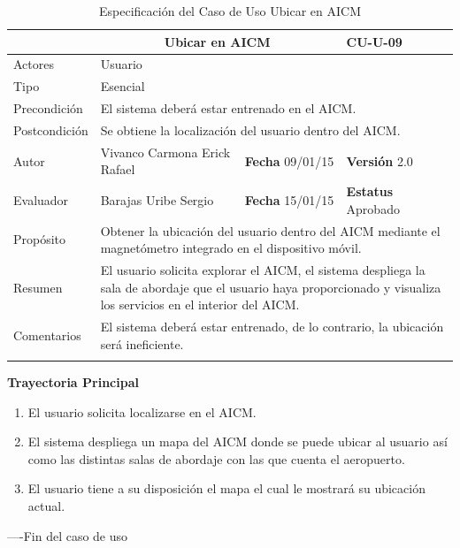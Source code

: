\begin{longtable}{|p{2.5cm}|p{6.4cm}|p{2cm}|p{2cm}|}
	\hline
		\rowcolor[RGB]{51,153,255}{Caso de Uso}&\multicolumn{2}{c}{Ubicar en AICM}&{\textbf{CU-U-09}}\\
	\hline
		{Actores}&\multicolumn{3}{p{11.2cm}|}{Usuario}\\
	\hline
		{Tipo}&\multicolumn{3}{p{11.2cm}|}{Esencial}\\
	\hline
		{Precondición}&\multicolumn{3}{p{11.2cm}|}{El sistema deberá estar entrenado en el AICM.}\\
	\hline
		{Postcondición}&\multicolumn{3}{p{11.2cm}|}{Se obtiene la localización del usuario dentro del AICM.}\\
	\hline
		{Autor}&{Vivanco Carmona Erick Rafael}&{\textbf{Fecha} 09/01/15}&{\textbf{Versión} 2.0}\\
			\hline
		{Evaluador}&{Barajas Uribe Sergio}&{\textbf{Fecha} 15/01/15}&{\textbf{Estatus} Aprobado}\\
	\hline
		{Propósito}&\multicolumn{3}{p{11.2cm}|}{Obtener la ubicación del usuario dentro del AICM mediante el magnetómetro integrado en el dispositivo móvil. }\\
	\hline
		{Resumen}&\multicolumn{3}{p{11.2cm}|}{El usuario solicita explorar el AICM, el sistema despliega la sala de abordaje que el usuario haya proporcionado y visualiza los servicios en el interior del AICM.}\\	
	\hline
		{Comentarios}&\multicolumn{3}{p{11.2cm}|}{El sistema deberá estar entrenado, de lo contrario, la ubicación será ineficiente.}\\
	\hline
	\caption[Especificación del Caso de Uso Ubicar en AICM]{Especificación del Caso de Uso Ubicar en AICM}
    	\label{tab:cuUbicarAICM}
\end{longtable}
\clearpage

\begin{flushleft}
	\textbf{Trayectoria Principal}\\
	\begin{enumerate}
		\item El usuario solicita localizarse en el AICM.
		\item El sistema despliega un mapa del AICM donde se puede ubicar al usuario así como las distintas salas de abordaje con las que cuenta el 
		aeropuerto.
		\item El usuario tiene a su disposición el mapa el cual le mostrará su ubicación actual.
	\end{enumerate}
\end{flushleft}
----Fin del caso de uso
\clearpage

